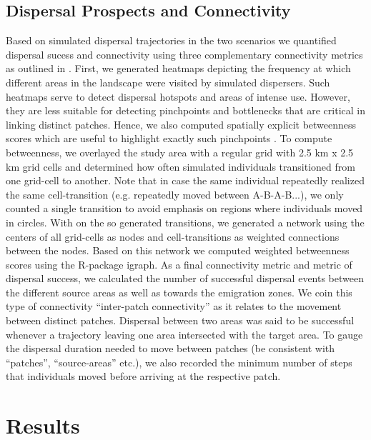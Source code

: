 \documentclass[abstract=on,10pt,a4paper,bibliography=totocnumbered]{article}
\begin{document}
\subsection{Dispersal Prospects and Connectivity}
Based on simulated dispersal trajectories in the two scenarios we quantified
dispersal sucess and connectivity using three complementary connectivity metrics
as outlined in \cite{Hofmann.2022}. First, we generated heatmaps depicting the
frequency at which different areas in the landscape were visited by simulated
dispersers. Such heatmaps serve to detect dispersal hotspots and areas of
intense use. However, they are less suitable for detecting pinchpoints and
bottlenecks that are critical in linking distinct patches. Hence, we also
computed spatially explicit betweenness scores which are useful to highlight
exactly such pinchpoints \citep{Bastille-Rousseau.2018, Bastille-Rousseau.2021}.
To compute betweenness, we overlayed the study area with a regular grid with 2.5
km x 2.5 km grid cells and determined how often simulated individuals
transitioned from one grid-cell to another. Note that in case the same
individual repeatedly realized the same cell-transition (e.g. repeatedly moved
between A-B-A-B...), we only counted a single transition to avoid emphasis on
regions where individuals moved in circles. With on the so generated
transitions, we generated a network using the centers of all grid-cells as nodes
and cell-transitions as weighted connections between the nodes. Based on this
network we computed weighted betweenness scores using the R-package
\textsf{igraph}. As a final connectivity metric and metric of dispersal success,
we calculated the number of successful dispersal events between the different
source areas as well as towards the emigration zones. We coin this type of
connectivity ``inter-patch connectivity'' as it relates to the movement between
distinct patches. Dispersal between two areas was said to be successful whenever
a trajectory leaving one area intersected with the target area. To gauge the
dispersal duration needed to move between patches (be consistent with
``patches'', ``source-areas'' etc.), we also recorded the minimum number of
steps that individuals moved before arriving at the respective patch.

\section{Results}
\end{document}
